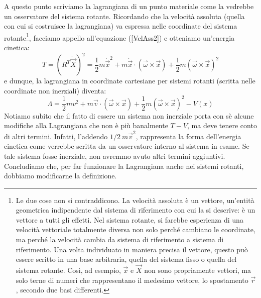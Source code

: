 \documentclass[a4paper,openany]{article}
\begin{document}
	A questo punto scriviamo la lagrangiana di un punto materiale come la vedrebbe un osservatore del sistema rotante. Ricordando che la velocità assoluta (quella con cui si costruisce la lagrangiana) va espressa nelle coordinate del sistema rotante\footnote{Le due cose non si contraddicono. La velocità assoluta è un vettore, un'entità geometrica indipendente dal sistema di riferimento con cui la si descrive: è un vettore a tutti gli effetti. Nel sistema rotante, si farebbe esperienza di una velocità vettoriale totalmente diversa non solo perché cambiano le coordinate, ma perché la velocità cambia da sistema di riferimento a sistema di riferimento. Una volta individuato in maniera precisa il vettore, questo può essere scritto in una base arbitraria, quella del sistema fisso o quella del sistema rotante. Così, ad esempio, $\vec{x}$ e $\vec{X}$ non sono propriamente vettori, ma solo terne di numeri che rappresentano il medesimo vettore, lo spostamento $\vec{r}$, secondo due basi differenti.}, facciamo appello all'equazione (\ref{VelAss2}) e otteniamo un'energia cinetica:
	\begin{equation}
		T = (R^{T}\dot{\vec{X}})^2 = \dfrac{1}{2}m\dot{\vec{x}}^{2} + m\dot{\vec{x}}\cdot(\vec{\omega}\times\vec{x})+ \dfrac{1}{2}m (\vec{\omega}\times\vec{x})^{2}
	\end{equation}
	e dunque, la lagrangiana in coordinate cartesiane per sistemi rotanti (scritta nelle coordinate non inerziali) diventa:
	\begin{equation}
		\Lambda = \dfrac{1}{2}mv^{2} + m\vec{v}\cdot(\vec{\omega}\times\vec{x}) + \dfrac{1}{2}m(\vec{\omega}\times\vec{x})^{2} - V(x)
		\label{LagRot}
	\end{equation}
	Notiamo subito che il fatto di essere un sistema non inerziale porta con sè alcune modifiche alla Lagrangiana che non è più banalmente $T-V$, ma deve tenere conto di altri termini. Infatti, l'addendo $1/2\> m\vec{v}^{2}$, rappresenta la forma dell'energia cinetica come verrebbe scritta da un osservatore interno al sistema in esame. Se tale sistema fosse inerziale, non avremmo avuto altri termini aggiuntivi. Concludiamo che, per far funzionare la Lagrangiana anche nei sistemi rotanti, dobbiamo modificarne la definizione.
\end{document}
